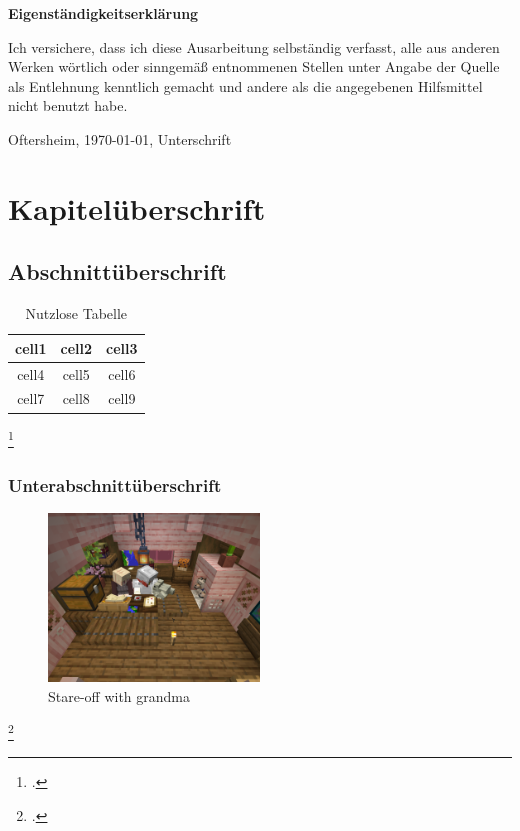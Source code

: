 \documentclass[12pt]{scrreprt}
\begin{document}
	\idate{\today}
	\irefnr{}
\makeititle

\begin{center}
	\bfseries{Eigenständigkeitserklärung}
\end{center}
Ich versichere, dass ich diese Ausarbeitung selbständig verfasst, alle aus anderen Werken
wörtlich oder sinngemäß entnommenen Stellen unter Angabe der Quelle als Entlehnung
kenntlich gemacht und andere als die angegebenen Hilfsmittel nicht benutzt habe.

Oftersheim, \today, Unterschrift

\tableofcontents
\listoffigures
\listoftables

\chapter{Kapitelüberschrift}
	\label{chap:kapitel}

\section{Abschnittüberschrift}
	\label{sec:abschnitt}

\lipsum[2-3]
\autocite[5]{a}

\begin{table}[!htb]
	\centering
	\caption[Nutzlose Tabelle {\autocite[4--5]{a}}]{Nutzlose Tabelle\footnotemark}
	\begin{tabular}{ |c|c|c| }
		\hline
		cell1 & cell2 & cell3 \\
		\hline
		cell4 & cell5 & cell6 \\
		cell7 & cell8 & cell9 \\
		\hline
	\end{tabular}
	\label{tab:useless}
\end{table}
\footcitetext[4--5]{a}

\subsection{Unterabschnittüberschrift}
	\label{sec:unterabschnitt}

\lipsum[1-2]
\autocite[1--5]{b}

\begin{figure}[!htb]
	\centering
	\includegraphics[width=0.5\textwidth]{image}
	\caption[Stare-off with grandma {\autocite[3]{c}}]{Stare-off with grandma\footnotemark}
	\label{fig:granny}
\end{figure}
\footcitetext[3]{a}
\end{document}
